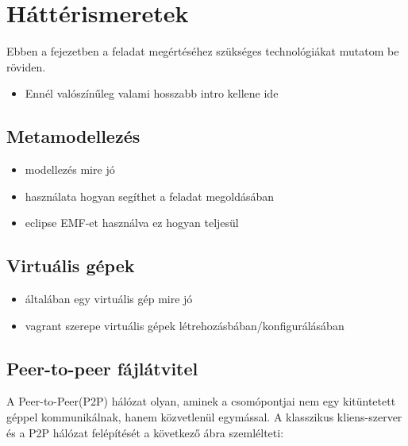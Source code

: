 \chapter{Háttérismeretek}
Ebben a fejezetben a feladat megértéséhez szükséges technológiákat mutatom be röviden.
\begin{itemize}
	\item Ennél valószínűleg valami hosszabb intro kellene ide 
\end{itemize}


\section{Metamodellezés}
\begin{itemize}
  \item modellezés mire jó
  \item	használata hogyan segíthet a feladat megoldásában
  \item eclipse EMF-et használva ez hogyan teljesül
\end{itemize}

\section{Virtuális gépek}
\begin{itemize}
  \item általában egy virtuális gép mire jó
  \item	vagrant szerepe virtuális gépek létrehozásbában/konfigurálásában
\end{itemize}

\section{Peer-to-peer fájlátvitel}
A Peer-to-Peer(P2P) hálózat olyan, aminek a csomópontjai nem egy kitüntetett géppel 
kommunikálnak, hanem közvetlenül egymással. A klasszikus kliens-szerver és a P2P hálózat felépítését
a következő ábra szemlélteti: %

